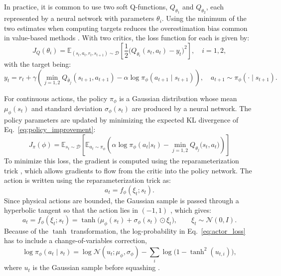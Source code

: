 \documentclass[preprint,10pt]{elsarticle}
\begin{document}
In practice, it is common to use two soft Q-functions, $Q_{\theta_1}$ and $Q_{\theta_2}$, each represented by a neural network with parameters $\theta_i$. Using the minimum of the two estimates when computing targets reduces the overestimation bias common in value-based methods \citep{fujimoto2018addressing,vanhasselt2010double}. With two critics, the loss function for each is given by:
\begin{equation}
    J_Q(\theta_i) = \mathbb{E}_{(s_t, a_t, r_t, s_{t+1}) \sim \mathcal{D}}\left[\frac{1}{2}\Big(Q_{\theta_i}(s_t, a_t) - y_t\Big)^2\right], \quad i = 1, 2,
    \label{eq:critic_loss}
\end{equation}
with the target being:
\begin{equation}
    y_t = r_t + \gamma \left( \min_{j=1,2} Q_{\bar{\theta}_j}(s_{t+1}, a_{t+1}) - \alpha \log \pi_\phi(a_{t+1} \mid s_{t+1}) \right), \quad a_{t+1} \sim \pi_\phi(\cdot \mid s_{t+1}).
    \label{eq:critic_target}
\end{equation}

For continuous actions, the policy $\pi_\phi$ is a Gaussian distribution whose mean $\mu_\phi(s_t)$ and standard deviation $\sigma_\phi(s_t)$ are produced by a neural network. The policy parameters are updated by minimizing the expected KL divergence of Eq.~\eqref{eq:policy_improvement}:
\begin{equation}
   J_\pi(\phi) = \mathbb{E}_{s_t \sim \mathcal{D}}\left[\mathbb{E}_{a_t \sim \pi_\phi}\left(\alpha \log \pi_\phi(a_t | s_t) - \min_{j=1,2} Q_{\theta_j}\big(s_t, a_t\big)\right)\right]
   \label{eq:actor_loss}
\end{equation}
To minimize this loss, the gradient is computed using the reparameterization trick \citep{kingma2014auto}, which allows gradients to flow from the critic into the policy network. The action is written using the reparameterization trick as:
\begin{equation}
    a_t = f_\phi(\xi_t; s_t).
    \label{eq:reparam}
\end{equation}
Since physical actions are bounded, the Gaussian sample is passed through a hyperbolic tangent so that the action lies in $(-1, 1)$ \citep{haarnoja2018soft}, which gives:
\begin{equation}
    a_t  = f_\phi(\xi_t; s_t) = \tanh\big(\mu_\phi(s_t) + \sigma_\phi(s_t) \odot \xi_t\big), \qquad \xi_t \sim \mathcal{N}(0, I).
\end{equation}
Because of the $\tanh$ transformation, the log-probability in Eq.~\eqref{eq:actor_loss} has to include a change-of-variables correction,
\begin{equation}
    \log \pi_\phi(a_t \mid s_t) = \log \mathcal{N}(u_t; \mu_\phi, \sigma_\phi) - \sum_i \log\big(1 - \tanh^2(u_{t,i})\big),
    \label{eq:tanh_correction}
\end{equation}
where $u_t$ is the Gaussian sample before squashing \citep{haarnoja2018soft}.
\end{document}
